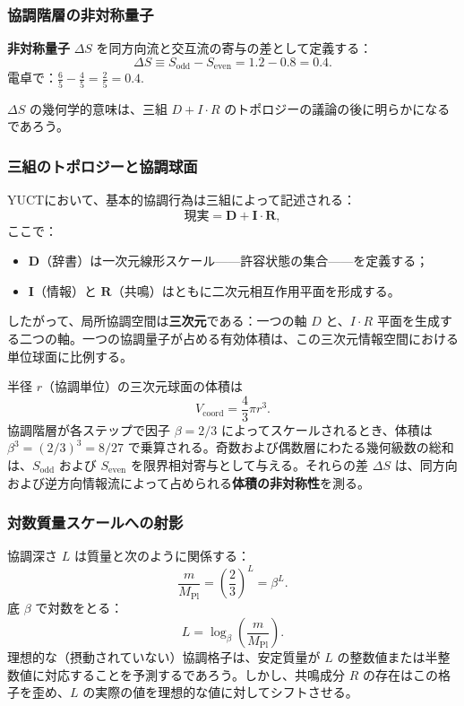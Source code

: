 \documentclass[11pt,a4paper]{article}
\begin{document}
	\subsubsection{協調階層の非対称量子}
	
	\textbf{非対称量子} \(\Delta S\) を同方向流と交互流の寄与の差として定義する：
	\[
	\Delta S \equiv S_{\mathrm{odd}} - S_{\mathrm{even}} = 1.2 - 0.8 = 0.4.
	\]
	電卓で：\(\frac{6}{5} - \frac{4}{5} = \frac{2}{5} = 0.4.\)
	
	\(\Delta S\) の幾何学的意味は、三組 \(D+I\cdot R\) のトポロジーの議論の後に明らかになるであろう。
	
	\subsubsection{三組のトポロジーと協調球面}
	
	YUCTにおいて、基本的協調行為は三組によって記述される：
	\[
	\text{現実} = \mathbf{D} + \mathbf{I}\cdot\mathbf{R},
	\]
	ここで：
	\begin{itemize}
		\item \(\mathbf{D}\)（辞書）は一次元線形スケール——許容状態の集合——を定義する；
		\item \(\mathbf{I}\)（情報）と \(\mathbf{R}\)（共鳴）はともに二次元相互作用平面を形成する。
	\end{itemize}
	したがって、局所協調空間は\textbf{三次元}である：一つの軸 \(D\) と、\(I\cdot R\) 平面を生成する二つの軸。一つの協調量子が占める有効体積は、この三次元情報空間における単位球面に比例する。
	
	半径 \(r\)（協調単位）の三次元球面の体積は
	\[
	V_{\text{coord}} = \frac{4}{3}\pi r^3.
	\]
	協調階層が各ステップで因子 \(\beta = 2/3\) によってスケールされるとき、体積は \(\beta^3 = (2/3)^3 = 8/27\) で乗算される。奇数および偶数層にわたる幾何級数の総和は、\(S_{\mathrm{odd}}\) および \(S_{\mathrm{even}}\) を限界相対寄与として与える。それらの差 \(\Delta S\) は、同方向および逆方向情報流によって占められる\textbf{体積の非対称性}を測る。
	
	\subsubsection{対数質量スケールへの射影}
	
	協調深さ \(L\) は質量と次のように関係する：
	\[
	\frac{m}{M_{\mathrm{Pl}}} = \left(\frac{2}{3}\right)^L = \beta^L.
	\]
	底 \(\beta\) で対数をとる：
	\[
	L = \log_{\beta}\left(\frac{m}{M_{\mathrm{Pl}}}\right).
	\]
	理想的な（摂動されていない）協調格子は、安定質量が \(L\) の整数値または半整数値に対応することを予測するであろう。しかし、共鳴成分 \(R\) の存在はこの格子を歪め、\(L\) の実際の値を理想的な値に対してシフトさせる。
	
\end{document}
